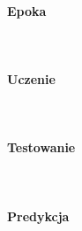 \paragraph{Epoka} \mbox{}\\

\paragraph{Uczenie} \mbox{}\\

\paragraph{Testowanie} \mbox{}\\

\paragraph{Predykcja} \mbox{}\\
